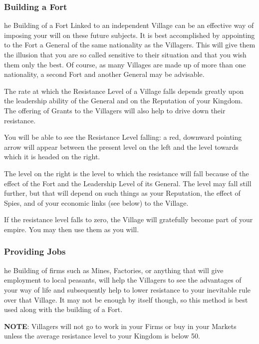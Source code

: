\subsubsection{Building a Fort}

he Building of a Fort Linked to an independent Village can be an effective way of imposing your will on these future subjects. It is best accomplished by appointing to the Fort a General of the same nationality as the Villagers. This will give them the illusion that you are so called sensitive to their situation and that you wish them only the best. Of course, as many Villages are made up of more than one nationality, a second Fort and another General may be advisable.

The rate at which the Resistance Level of a Village falls depends greatly upon the leadership ability of the General and on the Reputation of your Kingdom. The offering of Grants to the Villagers will also help to drive down their resistance.

You will be able to see the Resistance Level falling: a red, downward pointing arrow will appear between the present level on the left and the level towards which it is headed on the right.


The level on the right is the level to which the resistance will fall because of the effect of the Fort and the Leadership Level of its General. The level may fall still further, but that will depend on such things as your Reputation, the effect of Spies, and of your economic links (see below) to the Village.

If the resistance level falls to zero, the Village will gratefully become part of your empire. You may then use them as you will.

\subsubsection{Providing Jobs}

he Building of firms such as Mines, Factories, or anything that will give employment to local peasants, will help the Villagers to see the advantages of your way of life and subsequently help to lower resistance to your inevitable rule over that Village. It may not be enough by itself though, so this method is best used along with the building of a Fort.

\textbf{NOTE}: Villagers will not go to work in your Firms or buy in your Markets unless the average resistance level to your Kingdom is below 50. 

